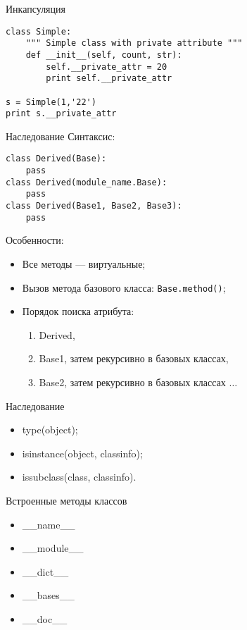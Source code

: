 \documentclass[hyperref={pdftex,unicode}]{beamer}
\begin{document}
\begin{frame}[fragile]{Инкапсуляция}
    \begin{lstlisting}
class Simple:
    """ Simple class with private attribute """
    def __init__(self, count, str):
        self.__private_attr = 20
        print self.__private_attr
 
s = Simple(1,'22')
print s.__private_attr
\end{lstlisting}
\end{frame}

\begin{frame}[fragile]{Наследование}
Синтаксис:
    \begin{lstlisting}[numbers=none]
class Derived(Base):
    pass
class Derived(module_name.Base):
    pass
class Derived(Base1, Base2, Base3):  
    pass
    \end{lstlisting}
Особенности:
\begin{itemize}
\item Все методы --- виртуальные;
\item Вызов метода базового класса: \lstinline$Base.method()$;
\item Порядок поиска атрибута:
  \begin{enumerate}
    \item
      Derived,
    \item Base1, затем рекурсивно в базовых классах,
    \item Base2, затем рекурсивно в базовых классах $\dots$
  \end{enumerate}
\end{itemize}
\end{frame}

\begin{frame}[fragile]{Наследование}
\begin{itemize}
\item type(object);
\item isinstance(object, classinfo);
\item issubclass(class, classinfo).
\end{itemize}
\end{frame}


\begin{frame}{Встроенные методы классов}
  \begin{itemize}
  \item \_\_name\_\_
  \item \_\_module\_\_
  \item \_\_dict\_\_
  \item \_\_bases\_\_
  \item \_\_doc\_\_
  \end{itemize}
\end{frame}
\end{document}
